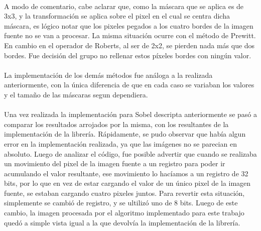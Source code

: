 \documentclass[11pt, a4paper]{article}
\begin{document}
\paragraph{}
A modo de comentario, cabe aclarar que, como la m\'ascara que se aplica es de 3x3, y la transformaci\'on se aplica sobre el pixel en el cual se centra dicha m\'ascara, es l\'ogico notar que los pixeles pegados a los cuatro bordes de la imagen fuente no se van a procesar. La misma situaci\'on ocurre con el m\'etodo de Prewitt. En cambio en el operador de Roberts, al ser de 2x2, se pierden nada m\'as que dos bordes. Fue decisi\'on del grupo no rellenar estos p\'ixeles bordes con ning\'un valor.

\paragraph{}
La implementaci\'on de los dem\'as m\'etodos fue an\'aloga a la realizada anteriormente, con la \'unica diferencia de que en cada caso se variaban los valores y el tama\~no de las m\'ascaras segun dependiera.

\paragraph{}
Una vez realizada la implementaci\'on para Sobel descripta anteriormente se pas\'o a comparar los resultados arrojados por la misma, con los resultantes de la implementaci\'on de la librer\'ia. R\'apidamente, se pudo observar que hab\'ia algun error en la implementaci\'on realizada, ya que las im\'agenes no se parecian en absoluto. Luego de analizar el c\'odigo, fue posible advertir que cuando se realizaba un movimiento del pixel de la imagen fuente a un registro para poder ir acumulando el valor resultante, ese movimiento lo hac\'iamos a un registro de 32 bits, por lo que en vez de estar cargando el valor de un \'unico pixel de la imagen fuente, se estaban cargando cuatro pixeles juntos. Para revertir esta situaci\'on, simplemente se cambi\'o de registro, y se ultiliz\'o uno de 8 bits. Luego de este cambio, la imagen procesada por el algoritmo implementado para este trabajo qued\'o a simple vista igual a la que devolv\'ia la implementaci\'on de la librer\'ia.
\end{document}
